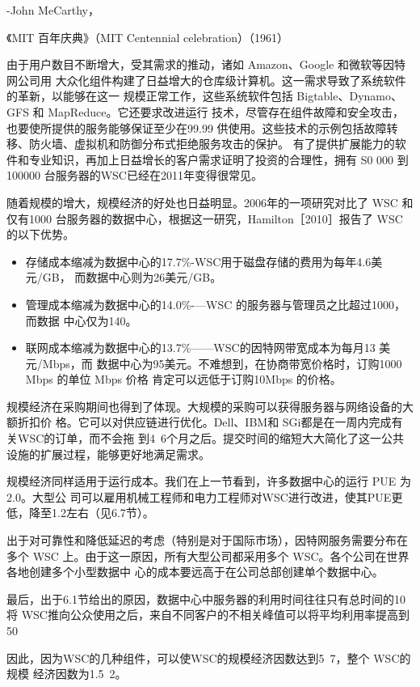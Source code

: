 -John MeCarthy，

《MIT 百年庆典》（MIT Centennial celebration）（1961）

由于用户数目不断增大，受其需求的推动，诸如 Amazon、Google 和微软等因特网公司用
大众化组件构建了日益增大的仓库级计算机。这一需求导致了系统软件的革新，以能够在这一
规模正常工作，这些系统软件包括 Bigtable、Dynamo、GFS 和 MapReduce。它还要求改进运行
技术，尽管存在组件故障和安全攻击，也要使所提供的服务能够保证至少在99.99%
供使用。这些技术的示例包括故障转移、防火墙、虚拟机和防御分布式拒绝服务攻击的保护。
有了提供扩展能力的软件和专业知识，再加上日益增长的客户需求证明了投资的合理性，拥有
S0 000 到100000 台服务器的WSC已经在2011年变得很常见。

随着规模的增大，规模经济的好处也日益明显。2006年的一项研究对比了 WSC 和仅有1000
台服务器的数据中心，根据这一研究，Hamilton［2010］报告了 WSC的以下优势。

\begin{itemize}
    \item 存储成本缩减为数据中心的17.7\%-WSC用于磁盘存储的费用为每年4.6美元/GB，
    而数据中心则为26美元/GB。
    \item 管理成本缩减为数据中心的14.0\%-—WSC 的服务器与管理员之比超过1000，而数据
    中心仅为140。
    \item 联网成本缩减为数据中心的13.7\%——WSC的因特网带宽成本为每月13 美元/Mbps，而
    数据中心为95美元。不难想到，在协商带宽价格时，订购1000 Mbps 的单位 Mbps 价格
    肯定可以远低于订购10Mbps 的价格。
\end{itemize}

规模经济在采购期间也得到了体现。大规模的采购可以获得服务器与网络设备的大额折扣价
格。它可以对供应链进行优化。Dell、IBM和 SGi都是在一周内完成有关WSC的订单，而不会拖
到4~6个月之后。提交时间的缩短大大简化了这一公共设施的扩展过程，能够更好地满足需求。

规模经济同样适用于运行成本。我们在上一节看到，许多数据中心的运行 PUE 为2.0。大型公
司可以雇用机械工程师和电力工程师对WSC进行改进，使其PUE更低，降至1.2左右（见6.7节）。

出于对可靠性和降低延迟的考虑（特别是对于国际市场），因特网服务需要分布在多个 WSC
上。由于这一原因，所有大型公司都采用多个 WSC。各个公司在世界各地创建多个小型数据中
心的成本要远高于在公司总部创建单个数据中心。

最后，出于6.1节给出的原因，数据中心中服务器的利用时间往往只有总时间的10%
将 WSC推向公众使用之后，来自不同客户的不相关峰值可以将平均利用率提高到50%

因此，因为WSC的几种组件，可以使WSC的规模经济因数达到5~7，整个 WSC的规模
经济因数为1.5~2。

